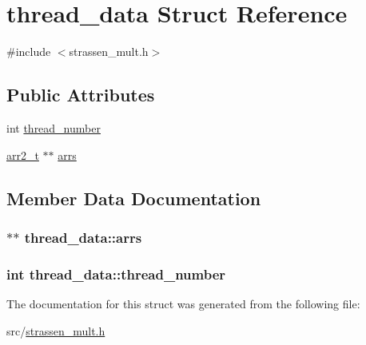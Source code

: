 \hypertarget{structthread__data}{}\section{thread\+\_\+data Struct Reference}
\label{structthread__data}


{\ttfamily \#include $<$strassen\+\_\+mult.\+h$>$}

\subsection*{Public Attributes}
\begin{DoxyCompactItemize}
\item 
int \hyperlink{structthread__data_a7dd1be44c9edf3196e112195112922c5}{thread\+\_\+number}
\item 
\hyperlink{data__structure2_8h_a8110829c1dff24d23496b87cfc8e95fc}{arr2\+\_\+t} $\ast$$\ast$ \hyperlink{structthread__data_a55174d395adc8f2c2dc005f20a77fad5}{arrs}
\end{DoxyCompactItemize}


\subsection{Member Data Documentation}
\subsubsection[{arrs}]{$\ast$$\ast$ thread\+\_\+data\+::arrs}\hypertarget{structthread__data_a55174d395adc8f2c2dc005f20a77fad5}{}\label{structthread__data_a55174d395adc8f2c2dc005f20a77fad5}
\subsubsection[{thread\+\_\+number}]{\setlength{\rightskip}{0pt plus 5cm}int thread\+\_\+data\+::thread\+\_\+number}\hypertarget{structthread__data_a7dd1be44c9edf3196e112195112922c5}{}\label{structthread__data_a7dd1be44c9edf3196e112195112922c5}


The documentation for this struct was generated from the following file\+:\begin{DoxyCompactItemize}
\item 
src/\hyperlink{strassen__mult_8h}{strassen\+\_\+mult.\+h}\end{DoxyCompactItemize}
